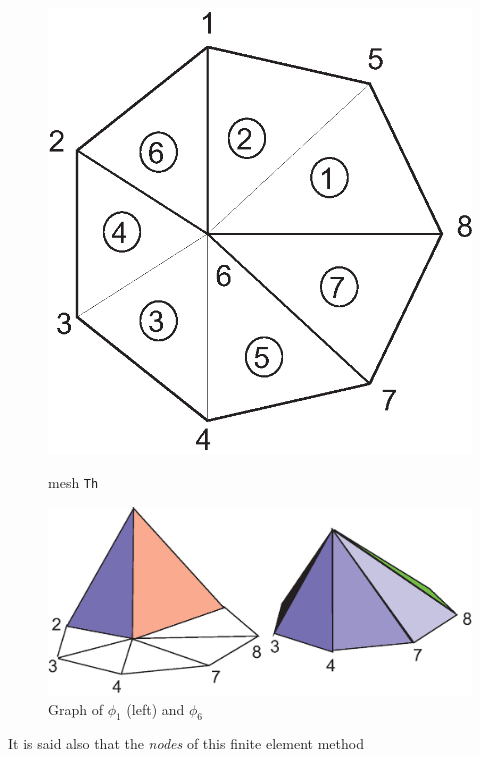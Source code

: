 \documentclass[a4paper,twoside,12pt]{book}
\begin{document}
\begin{figure}[htbp]
\begin{minipage}{\textwidth}
\begin{minipage}{0.3\textwidth}
\includegraphics[width=\textwidth]{secondT}%
\caption{mesh \texttt{Th}}
\end{minipage}
\hspace{0.5mm}
\begin{minipage}{0.7\textwidth}
\includegraphics[width=\textwidth]{hat}%
\caption{Graph of $\phi_1$ (left) and $\phi_6$ \label{fig-hatFunction}}
\end{minipage}
\end{minipage}
\end{figure}
It is said also that the \emph{nodes} of this finite element method
\end{document}
